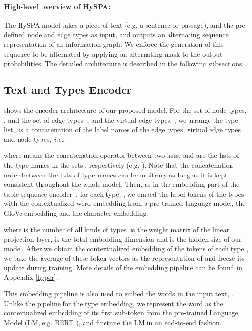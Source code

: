 \documentclass[11pt,a4paper]{article}
\begin{document}
\paragraph{High-level overview of HySPA:} The HySPA model takes a piece of text (e.g. a sentence or passage), and the pre-defined node and edge types as input, and outputs an alternating sequence representation of an information graph. We enforce the generation of this sequence to be alternated by applying an alternating mask to the output probabilities. The detailed architecture is described in the following subsections.

\subsection{Text and Types Encoder}

 shows the encoder architecture of our proposed model. For the set of node types, , and the set of edge types, , and the virtual edge types, , we arrange the type list,  as a concatenation of the label names of the edge types, virtual edge types and node types, \emph{i.e.}, 

where  means the concatenation operator between two lists, and  are the lists of the type names in the sets , respectively (e.g. ). Note that the concatenation order between the lists of type names can be arbitrary as long as it is kept consistent throughout the whole model.
Then, as in the embedding part of the table-sequence encoder~\cite{tse}, for each type, , we embed the label tokens of the types with the contextualized word embedding from a pre-trained language model, the GloVe embedding \cite{glove} and the character embedding,


 
where  is the number of all kinds of types,  is the weight matrix of the linear projection layer,  is the total embedding dimension and  is the hidden size of our model. After we obtain the contextualized embedding of the tokens of each type , we take the average of these token vectors as the representation of  and freeze its update during training. More details of the embedding pipeline can be found in Appendix \ref{hyper}.

This embedding pipeline is also used to embed the words in the input text, . Unlike the pipeline for the type embedding, we represent the word as the contextualized embedding of its first sub-token from the pre-trained Language Model (LM, e.g. BERT \cite{bert}), and finetune the LM in an end-to-end fashion.
\end{document}
